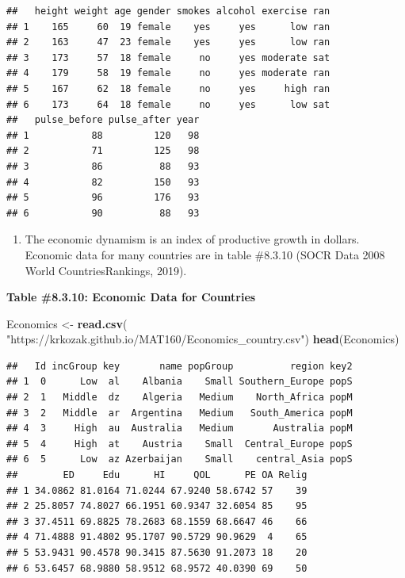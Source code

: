 \documentclass[
]{book}
\newenvironment{Shaded}{\begin{snugshade}}{\end{snugshade}}
\newcommand{\KeywordTok}[1]{\textcolor[rgb]{0.13,0.29,0.53}{\textbf{#1}}}
\newcommand{\NormalTok}[1]{#1}
\newcommand{\StringTok}[1]{\textcolor[rgb]{0.31,0.60,0.02}{#1}}
\providecommand{\tightlist}{%
  \setlength{\itemsep}{0pt}\setlength{\parskip}{0pt}}
\begin{document}
\begin{verbatim}
##   height weight age gender smokes alcohol exercise ran
## 1    165     60  19 female    yes     yes      low ran
## 2    163     47  23 female    yes     yes      low ran
## 3    173     57  18 female     no     yes moderate sat
## 4    179     58  19 female     no     yes moderate ran
## 5    167     62  18 female     no     yes     high ran
## 6    173     64  18 female     no     yes      low sat
##   pulse_before pulse_after year
## 1           88         120   98
## 2           71         125   98
## 3           86          88   93
## 4           82         150   93
## 5           96         176   93
## 6           90          88   93
\end{verbatim}

\begin{enumerate}
\def\labelenumi{\arabic{enumi}.}
\setcounter{enumi}{4}
\tightlist
\item
  The economic dynamism is an index of productive growth in dollars. Economic data for many countries are in table \#8.3.10 (SOCR Data 2008 World CountriesRankings, 2019).
\end{enumerate}

\textbf{Table \#8.3.10: Economic Data for Countries}

\begin{Shaded}
\begin{Highlighting}[]
\NormalTok{Economics <-}\StringTok{ }\KeywordTok{read.csv}\NormalTok{(}
  \StringTok{"https://krkozak.github.io/MAT160/Economics_country.csv"}\NormalTok{)}
\KeywordTok{head}\NormalTok{(Economics)}
\end{Highlighting}
\end{Shaded}

\begin{verbatim}
##   Id incGroup key       name popGroup          region key2
## 1  0      Low  al    Albania    Small Southern_Europe popS
## 2  1   Middle  dz    Algeria   Medium    North_Africa popM
## 3  2   Middle  ar  Argentina   Medium   South_America popM
## 4  3     High  au  Australia   Medium       Australia popM
## 5  4     High  at    Austria    Small  Central_Europe popS
## 6  5      Low  az Azerbaijan    Small    central_Asia popS
##        ED     Edu      HI     QOL      PE OA Relig
## 1 34.0862 81.0164 71.0244 67.9240 58.6742 57    39
## 2 25.8057 74.8027 66.1951 60.9347 32.6054 85    95
## 3 37.4511 69.8825 78.2683 68.1559 68.6647 46    66
## 4 71.4888 91.4802 95.1707 90.5729 90.9629  4    65
## 5 53.9431 90.4578 90.3415 87.5630 91.2073 18    20
## 6 53.6457 68.9880 58.9512 68.9572 40.0390 69    50
\end{verbatim}
\end{document}
